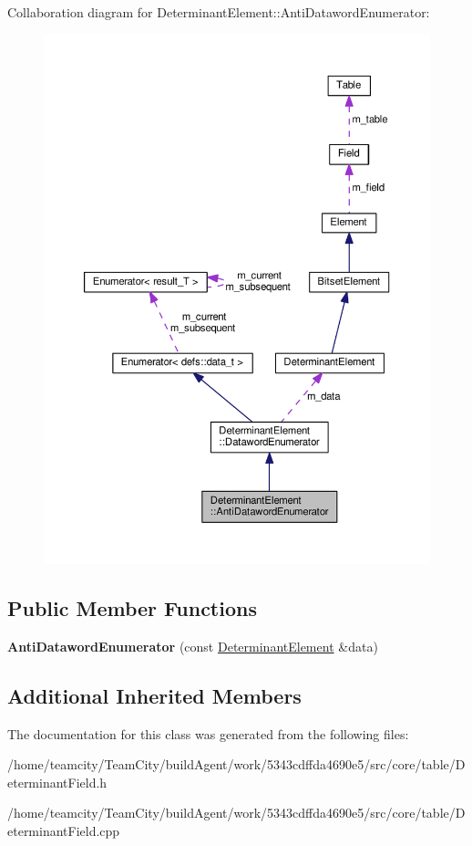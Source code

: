 Collaboration diagram for Determinant\+Element\+:\+:Anti\+Dataword\+Enumerator\+:
\nopagebreak
\begin{figure}[H]
\begin{center}
\leavevmode
\includegraphics[width=350pt]{classDeterminantElement_1_1AntiDatawordEnumerator__coll__graph}
\end{center}
\end{figure}
\subsection*{Public Member Functions}
\begin{DoxyCompactItemize}
\item 
{\bfseries Anti\+Dataword\+Enumerator} (const \hyperlink{classDeterminantElement}{Determinant\+Element} \&data)\hypertarget{classDeterminantElement_1_1AntiDatawordEnumerator_a09e78d2e57f66b5b7186ac7979c877ba}{}\label{classDeterminantElement_1_1AntiDatawordEnumerator_a09e78d2e57f66b5b7186ac7979c877ba}

\end{DoxyCompactItemize}
\subsection*{Additional Inherited Members}


The documentation for this class was generated from the following files\+:\begin{DoxyCompactItemize}
\item 
/home/teamcity/\+Team\+City/build\+Agent/work/5343cdffda4690e5/src/core/table/Determinant\+Field.\+h\item 
/home/teamcity/\+Team\+City/build\+Agent/work/5343cdffda4690e5/src/core/table/Determinant\+Field.\+cpp\end{DoxyCompactItemize}
